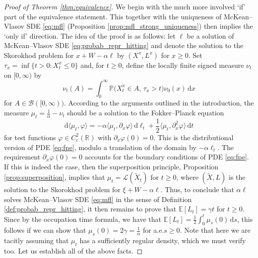 \documentclass[11pt, a4paper]{article}
\theoremstyle{plain}
\theoremstyle{definition}
\theoremstyle{remark}
\numberwithin{equation}{section}
\newcommand{\ev}{\mathbb{E}}
\newcommand{\pr}{\mathbb{P}}
\newcommand{\R}{\mathbb{R}}
\renewcommand{\L}{\mathcal{L}}
\renewcommand{\d}{\mathrm{d}}
\newcommand{\define}{\mathpunct{:}}
\renewcommand{\cal}[1]{\mathcal{#1}}
\begin{document}
\begin{proof}[Proof of Theorem \ref{thm:equivalence}]
We begin with the much more involved `if' part of the equivalence statement. This together with the uniqueness of McKean--Vlasov SDE \eqref{eq:mfl} (Proposition \ref{prop:mfl_strong_uniqueness}) then implies the `only if' direction. The idea of the proof is as follows: let $\ell$ be a solution of McKean--Vlasov SDE \eqref{eq:probab_repr_hitting} and denote the solution to the Skorokhod problem for $x + W - \alpha \ell$ by $(X^x, L^x)$ for $x \geq 0$. Set $\tau_x = \inf\{t > 0 \define X^x_t \leq 0\}$ and, for $t \geq 0$, define the locally finite signed measure $\nu_t$ on $[0, \infty)$ by
\begin{equation} \label{eq:def_of_nu}
    \nu_t(A) = \int_0^{\infty} \pr\bigl(X^x_t \in A, \, \tau_x > t\bigr) \nu_0(x) \, \d x
\end{equation}
for $A \in \cal{B}([0, \infty))$. According to the arguments outlined in the introduction, the measure $\mu_t = \frac{1}{\alpha} - \nu_t$ should be a solution to the Fokker--Planck equation
\begin{equation} \label{eq:fpe_2}
    \d \langle \mu_t, \varphi\rangle = - \alpha \langle \mu_t, \partial_x \varphi\rangle \, \d \ell_t + \frac{1}{2} \langle \mu_t, \partial_x^2 \varphi\rangle \, \d t
\end{equation}
for test functions $\varphi \in C_c^2(\R)$ with $\partial_x \varphi(0) = 0$. This is the distributional version of PDE \eqref{eq:fpe}, modulo a translation of the domain by $- \alpha \ell_t$. The requirement $\partial_x \varphi(0) = 0$ accounts for the boundary conditions of PDE \eqref{eq:fpe}. If this is indeed the case, then the superposition principle, Proposition \ref{prop:superposition}, implies that $\mu_t = \L(\tilde{X}_t)$ for $t \geq 0$, where $(\tilde{X}, L)$ is the solution to the Skorokhod problem for $\xi + W - \alpha \ell$. Thus, to conclude that $\alpha \ell$ solves McKean--Vlasov SDE \eqref{eq:mfl} in the sense of Definition \ref{def:probab_repr_hitting}, it then remains to prove that $\ev[L_t] = \gamma t$ for $t \geq 0$. Since by the occupation time formula, we have that $\ev[L_t] = \frac{1}{2} \int_0^t \mu_s(0) \, \d s$, this follows if we can show that $\mu_s(0) = 2\gamma = \frac{1}{\alpha}$ for a.e.\@ $s \geq 0$. Note that here we are tacitly assuming that $\mu_t$ has a sufficiently regular density, which we must verify too. Let us establish all of the above facts.


\end{proof}
\end{document}
